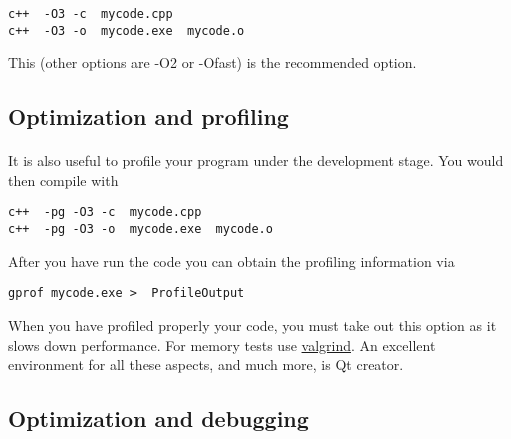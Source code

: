 \begin{verbatim}
c++  -O3 -c  mycode.cpp
c++  -O3 -o  mycode.exe  mycode.o

\end{verbatim}

This (other options are -O2 or -Ofast) is the recommended option.



\subsection*{Optimization and profiling}

\paragraph{}
It is also useful to profile your program under the development stage.
You would then compile with 



\begin{verbatim}
c++  -pg -O3 -c  mycode.cpp
c++  -pg -O3 -o  mycode.exe  mycode.o

\end{verbatim}

After you have run the code you can obtain the profiling information via


\begin{verbatim}
gprof mycode.exe >  ProfileOutput

\end{verbatim}

When you have profiled properly your code, you must take out this option as it 
slows down performance.
For memory tests use \href{{http://www.valgrind.org}}{valgrind}. An excellent environment for all these aspects, and much  more, is  Qt creator.



\subsection*{Optimization and debugging}

